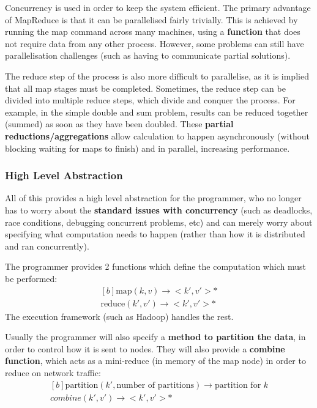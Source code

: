 \documentclass{article}
\begin{document}
Concurrency is used in order to keep the system efficient. The primary advantage of MapReduce is that it can be parallelised fairly trivially. This is achieved by running the map command across many machines, using a \textbf{function} that does not require data from any other process. However, some problems can still have parallelisation challenges (such as having to communicate partial solutions).

The reduce step of the process is also more difficult to parallelise, as it is implied that all map stages must be completed. Sometimes, the reduce step can be divided into multiple reduce steps, which divide and conquer the process. For example, in the simple double and sum problem, results can be reduced together (summed) as soon as they have been doubled. These \textbf{partial reductions/aggregations} allow calculation to happen asynchronously (without blocking waiting for maps to finish) and in parallel, increasing performance.

\subsubsection{High Level Abstraction}

All of this provides a high level abstraction for the programmer, who no longer has to worry about the \textbf{standard issues with concurrency} (such as deadlocks, race conditions, debugging concurrent problems, etc) and can merely worry about specifying what computation needs to happen (rather than how it is distributed and ran concurrently). 

The programmer provides 2 functions which define the computation which must be performed:
\begin{equation}
\begin{aligned}[b]
	\text{map}(k, v) \rightarrow <k', v'>* \\
	\text{reduce}(k', v') \rightarrow <k', v'>*
\end{aligned}
\end{equation}
The execution framework (such as Hadoop) handles the rest. 

Usually the programmer will also specify a \textbf{method to partition the data}, in order to control how it is sent to nodes. They will also provide a \textbf{combine function}, which acts as a mini-reduce (in memory of the map node) in order to reduce on network traffic:
\begin{equation}
\begin{aligned}[b]
	\text{partition}(k', \text{number of partitions}) \rightarrow \text{partition for }k \\
	combine(k', v') \rightarrow <k', v'>*
\end{aligned}
\end{equation}
\end{document}
